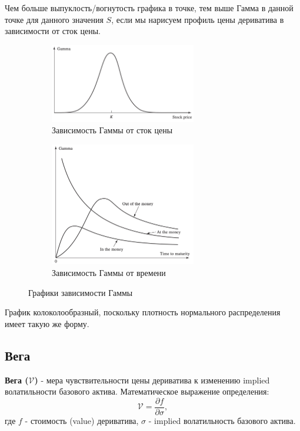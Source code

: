 \documentclass{article}
\begin{document}
Чем больше выпуклость/вогнутость графика в точке, тем выше Гамма в данной точке для данного значения $S$, если мы нарисуем профиль цены дериватива в зависимости от сток цены.



\begin{figure}[h]
	\centering
	\begin{subfigure}{.49\textwidth}
		\centering
		\includegraphics[width=0.7\textwidth]{gamma-stock.jpg}
		\caption{Зависимость Гаммы от сток цены}
		\label{model}
	\end{subfigure}
	\begin{subfigure}{.5\textwidth}
		\centering
		\includegraphics[width=0.7\textwidth]{gamma-time.jpg}
		\caption{Зависимость Гаммы от времени}
		\label{model}
	\end{subfigure}
	
	\caption{Графики зависимости Гаммы}
	\label{model}
\end{figure}


График колоколообразный, поскольку плотность нормального распределения имеет такую же форму.


\subsection{Вега}
 \textbf{Вега ($\mathcal{V}$) } - мера чувствительности цены дериватива к изменению implied волатильности базового актива. Математическое выражение определения: $$\mathcal{V} = \dfrac{\partial f}{\partial \sigma},$$ где $f$ - стоимость (value) дериватива, $\sigma$ - implied волатильность базового актива.
 
\end{document}
